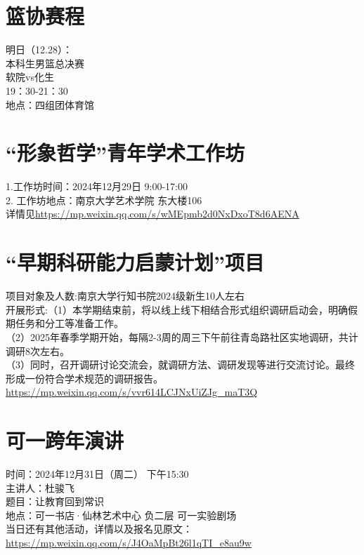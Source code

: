 \documentclass[letterpaper, 12pt]{article}
\begin{document}
\begin{multicols}{2}
\section{篮协赛程}
明日（12.28）：\\
本科生男篮总决赛\\
软院vs化生 \\
19：30-21：30\\
地点：四组团体育馆


\section{“形象哲学”青年学术工作坊}
1.工作坊时间：2024年12月29日 9:00-17:00\\
2. 工作坊地点：南京大学艺术学院 东大楼106\\
详情见\url{https://mp.weixin.qq.com/s/wMEpmb2d0NxDxoT8d6AENA}
\section{ “早期科研能力启蒙计划”项目}
项目对象及人数:南京大学行知书院2024级新生10人左右\\
开展形式:（1）本学期结束前，将以线上线下相结合形式组织调研启动会，明确假期任务和分工等准备工作。\\
（2）2025年春季学期开始，每隔2-3周的周三下午前往青岛路社区实地调研，共计调研8次左右。\\
（3）同时，召开调研讨论交流会，就调研方法、调研发现等进行交流讨论。最终形成一份符合学术规范的调研报告。\\
\url{https://mp.weixin.qq.com/s/vvr614LCJNxUiZJg_maT3Q}\\
\section{可一跨年演讲}
时间：2024年12月31日（周二） 下午15:30\\
主讲人：杜骏飞\\
题目：让教育回到常识\\
地点：可一书店·仙林艺术中心 负二层 可一实验剧场\\
当日还有其他活动，详情以及报名见原文：\url{https://mp.weixin.qq.com/s/J4OaMpBt26l1qTI_e8au9w}

\end{multicols} 
\end{document}
